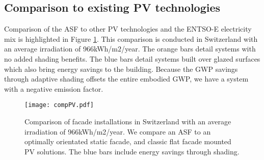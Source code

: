 \subsection{Comparison to existing PV technologies}

Comparison of the ASF to other PV technologies and the ENTSO-E electricity mix is highlighted in Figure \ref{fig:compPV}. This comparison is conducted in Switzerland with an average irradiation of 966kWh/m$2$/year.
The orange bars detail systems with no added shading benefits. The blue bars detail systems built over glazed surfaces which also bring energy savings to the building. Because the GWP savings through adaptive shading offsets the entire embodied GWP, we have a system with a negative emission factor.




\begin{figure}[H]
\begin{center}
\texttt{[image: compPV.pdf]}
\caption{Comparison of facade installations in Switzerland with an average irradiation of 966kWh/m2/year.
We compare an ASF to an optimally orientated static facade, and classic flat facade mounted PV solutions. The blue bars include energy savings through shading.}
\label{fig:compPV}
\end{center}
\end{figure}





